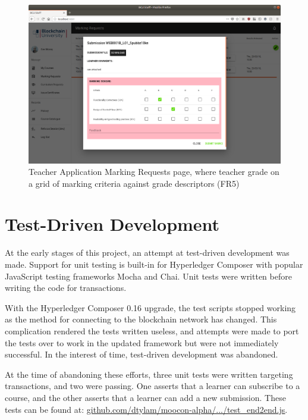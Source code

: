 \begin{figure}[!ht]
	\centering
	\includegraphics[width=1.05\textwidth]{Teacher_marking}
	\caption[Teacher Application Marking Requests page]
	{Teacher Application Marking Requests page, 
	where teacher grade on a grid of marking criteria against grade descriptors (FR5)}
	\label{fig:Teacher_marking}
\end{figure}

\clearpage
\section{Test-Driven Development}

At the early stages of this project, an attempt at test-driven development was made. 
Support for unit testing is built-in for Hyperledger Composer with popular JavaScript testing frameworks Mocha and Chai.
Unit tests were written before writing the code for transactions.

With the Hyperledger Composer 0.16 upgrade, the test scripts stopped working as 
the method for connecting to the blockchain network has changed. This complication 
rendered the tests written useless, and attempts were made to port the tests over 
to work in the updated framework but were not immediately successful. In the interest of 
time, test-driven development was abandoned.

At the time of abandoning these efforts, three unit tests were written targeting transactions, 
and two were passing. One asserts that a learner can subscribe to a course, 
and the other asserts that a learner can add a new submission. 
These tests can be found at: \href{https://github.com/dtylam/moocon-alpha/blob/master/test/test_end2end.js}
{\underline{github.com/dtylam/moocon-alpha/.../test\_end2end.js}}.

